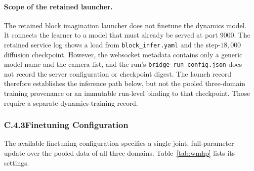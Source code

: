 \documentclass[letterpaper]{article} %
\begin{document}
\paragraph{Scope of the retained launcher.}
The retained block imagination launcher does not finetune the dynamics model.
It connects the learner to a model that must already be served at port 9000.
The retained service log shows a load from \texttt{block\_infer.yaml} and the
step-$18{,}000$ diffusion checkpoint. However, the websocket metadata contains
only a generic model name and the camera list, and the run's
\texttt{bridge\_run\_config.json} does not record the server configuration or
checkpoint digest. The launch record therefore establishes the inference path
below, but not the pooled three-domain training provenance or an immutable
run-level binding to that checkpoint. Those require a separate
dynamics-training record.

\subsubsection{C.4.3\quad Finetuning Configuration}

The available finetuning configuration specifies a single joint,
full-parameter update over the pooled data of all three domains.
Table~\ref{tab:wmhp} lists its settings.
\end{document}
